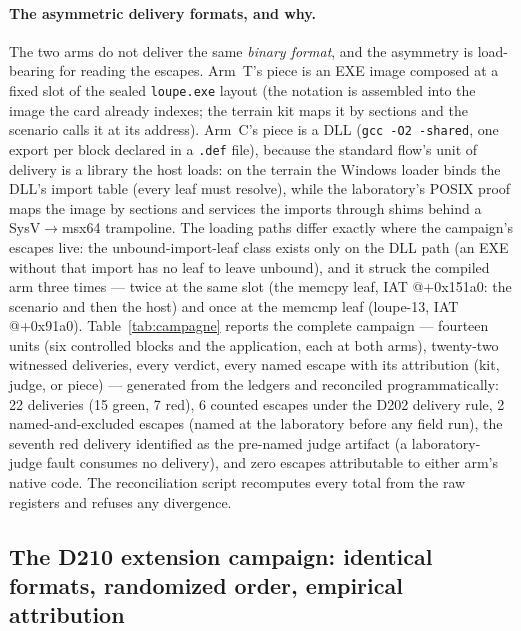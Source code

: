 \documentclass[10pt,a4paper]{article}
\newcommand{\code}[1]{\texttt{\small #1}}
\begin{document}
\paragraph{The asymmetric delivery formats, and why.} The two arms do
not deliver the same \emph{binary format}, and the asymmetry is
load-bearing for reading the escapes. Arm~T's piece is an EXE image
composed at a fixed slot of the sealed \code{loupe.exe} layout (the
notation is assembled into the image the card already indexes; the
terrain kit maps it by sections and the scenario calls it at its
address). Arm~C's piece is a DLL (\code{gcc -O2 -shared}, one export
per block declared in a \code{.def} file), because the standard flow's
unit of delivery is a library the host loads: on the terrain the
Windows loader binds the DLL's import table (every leaf must resolve),
while the laboratory's POSIX proof maps the image by sections and
services the imports through shims behind a SysV$\to$msx64 trampoline.
The loading paths differ exactly where the campaign's escapes live:
the unbound-import-leaf class exists only on the DLL path (an EXE
without that import has no leaf to leave unbound), and it struck the
compiled arm three times --- twice at the same slot (the memcpy leaf,
IAT @+0x151a0: the scenario and then the host) and once at the memcmp
leaf (loupe-13, IAT @+0x91a0). Table~\ref{tab:campagne}
reports the complete campaign --- fourteen units (six controlled blocks
and the application, each at both arms), twenty-two witnessed
deliveries, every verdict, every named escape with its attribution
(kit, judge, or piece) --- generated from the ledgers and reconciled
programmatically: 22 deliveries (15 green, 7 red), 6 counted escapes
under the D202 delivery rule, 2 named-and-excluded escapes (named at
the laboratory before any field run), the seventh red delivery
identified as the pre-named judge artifact (a laboratory-judge fault
consumes no delivery), and zero escapes attributable to either arm's
native code. The reconciliation script recomputes every total from the
raw registers and refuses any divergence.



\subsection{The D210 extension campaign: identical formats, randomized
order, empirical attribution}\label{sec:d210}
\end{document}
